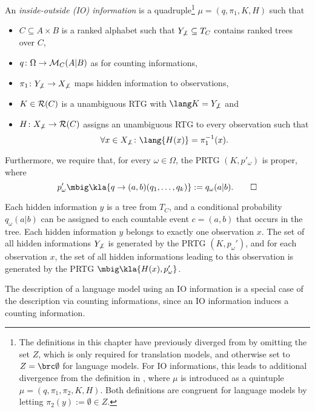 \begin{definition}\label{02:def-io-info}
 An \emph{inside-outside (IO) information} is a quadruple\footnote{The definitions
 in this chapter have previously diverged from \cite{bucstuvog15} by omitting
 the set $Z$, which is only required for translation models, and otherwise set
 to $Z=\brc\emptyset$ for language models. For IO informations, this leads to
 additional divergence from the definition in \cite{bucstuvog15}, where $\mu$
 is introduced as a quintuple $\mu=(q,\pi_1,\pi_2,K,H)$. Both definitions are
 congruent for language models by letting $\pi_2(y) :=
 \emptyset\in Z$.} $\mu = (q,\pi_1,K,H)$ such that
 \begin{itemize}\setlength\itemsep{-0.3em}
  \item $C\subseteq A\times B$ is a ranked alphabet such that $Y_{\not\bot}\subseteq T_C$ contains ranked trees over $C$,
  \item $q\colon\Omega\to\mathcal M_C(A|B)$ as for counting informations,
  \item $\pi_1\colon Y_{\not\bot}\to X_{\not\bot}$ maps hidden information to observations,
  \item $K\in\mathcal R(C)$ is a unambiguous RTG with $\lang K = Y_{\not\bot}$ and
  \item $H\colon X_{\not\bot}\to\mathcal R(C)$ assigns an unambiguous RTG to every observation such that 
   \[
    \forall x\in X_{\not\bot}\colon \lang{H(x)} = \pi_1^{-1}(x).
   \]
 \end{itemize}
 Furthermore, we require that, for every $\omega\in\Omega$, the PRTG $(K,p'_\omega)$ is proper, where
 \[
  p'_\omega\mbig\kla{q\to(a,b)(q_1,\ldots,q_k)} := q_\omega(a|b).
  \qedhere
 \]
\end{definition}

Each hidden information $y$ is a tree from $T_C$, and a conditional probability
$q_\omega(a|b)$ can be assigned to each countable event $c = (a,b)$ that occurs
in the tree. Each hidden information $y$ belongs to exactly one observation
$x$. The set of all hidden informations $Y_{\not\bot}$ is generated by the PRTG
$(K,p_\omega')$, and for each observation $x$, the set of all hidden
informations leading to this observation is generated by the PRTG
$\mbig\kla{H(x),p_\omega'}$.

The description of a language model using an IO information is a special case of
the description via counting informations, since an IO information induces a
counting information.

